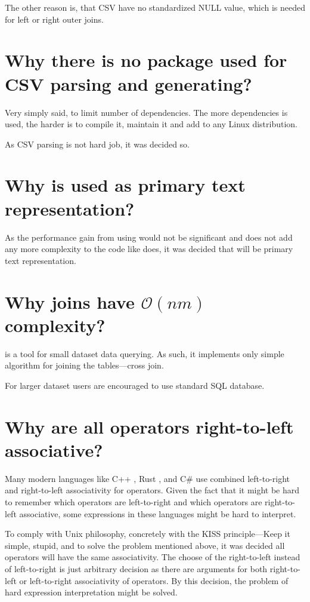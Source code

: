 The other reason is, that CSV have no standardized NULL value, which is needed for left or right outer joins.

\section{Why there is no package used for CSV parsing and generating?}
Very simply said, to limit number of dependencies. The more dependencies is used, the harder is to compile it, maintain it and add to any Linux distribution.

As CSV parsing is not hard job, it was decided so.

\section{Why  is used as primary text representation?}
As the performance gain from using  would not be significant and  does not add any more complexity to the code like  does, 
it was decided that  will be primary text representation.

\section{Why joins have $\mathcal{O}(nm)$ complexity?}
 is a tool for small dataset data querying. As such, it implements only simple algorithm for joining the tables---cross join.

For larger dataset users are encouraged to use standard SQL database.

\section{Why are all operators right-to-left associative?}
Many modern languages like C++ \cite{cpp-associativity-manual}, Rust \cite{rust-expressions}, and C\# \cite{csharp-expressions} use combined left-to-right and right-to-left associativity for operators.
Given the fact that it might be hard to remember which operators are left-to-right and which operators are right-to-left associative, some expressions in these languages might be hard to interpret.

To comply with Unix philosophy, concretely with the KISS principle---Keep it simple, stupid\cite{enwiki-kiss}, and to solve the problem mentioned above, it was decided all operators will have the same associativity.
The choose of the right-to-left instead of left-to-right is just arbitrary decision as there are arguments for both right-to-left or left-to-right associativity of operators.
By this decision, the problem of hard expression interpretation might be solved.
